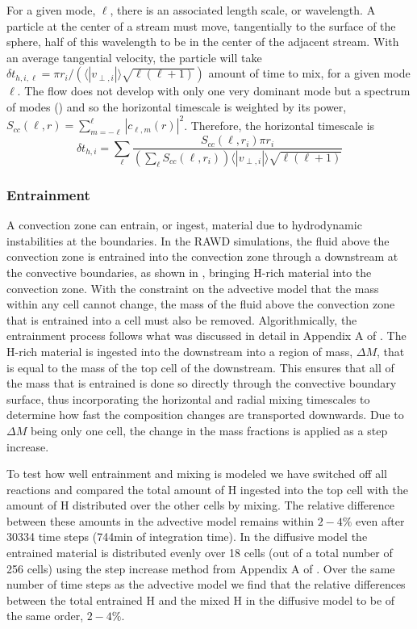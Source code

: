 \documentclass[fleqn,usenatbib]{mnras}
\newcommand{\cldfluid}{fluid above the convection zone}
\begin{document}
For a given mode, $\ell$, there is an associated length scale, or wavelength. A
particle at the center of a stream must move, tangentially to the surface of the
sphere, half of this wavelength to be in the center of the adjacent stream. With
an average tangential velocity, the particle will take $\delta t_{h,i,\ell} =
\pi r_{i} / \left( \langle|v_{\perp,i}|\rangle\sqrt{\ell(\ell+1)} \right)$
amount of time to mix, for a given mode $\ell$. The flow does not develop with
only one very dominant mode but a spectrum of modes () and
so the horizontal timescale is weighted by its power, $S_{cc}(\ell,r) =
\sum_{m=-\ell}^{\ell}|c_{\ell,m}(r)|^{2}$. Therefore, the horizontal timescale
is
%
\begin{equation}
  \label{eq:horizontalT}
  \delta t_{h,i} = \sum_{\ell} \frac{S_{cc}(\ell,r_{i}) \pi r_{i}}{\left( \sum\limits_{\ell} S_{cc}(\ell,r_{i}) \right) \langle |v_{\perp,i}| \rangle\sqrt{\ell(\ell+1)}}
\end{equation}

\subsubsection{Entrainment}
\label{sec:entrain}

A convection zone can entrain, or ingest, material due to hydrodynamic
instabilities at the boundaries. In the RAWD simulations, the \cldfluid{} 
is entrained into the convection zone through a downstream at the convective
boundaries, as shown in , bringing H-rich material into the
convection zone. With the constraint on the advective model that the mass within
any cell cannot change, the mass of the \cldfluid{} that is entrained into
a cell must also be removed. Algorithmically, the entrainment process follows
what was discussed in detail in Appendix A of \citet{Denissenkov:19}. The H-rich
material is ingested into the downstream into a region of mass, $\Delta M$, that
is equal to the mass of the top cell of the downstream. This ensures that all of
the mass that is entrained is done so directly through the convective boundary
surface, thus incorporating the horizontal and radial mixing timescales to
determine how fast the composition changes are transported downwards. Due to
$\Delta M$ being only one cell, the change in the mass fractions is applied as a
step increase.

To test how well entrainment and mixing is modeled we have switched off
all reactions and compared the total amount of H ingested into the top cell with
the amount of H distributed over the other cells by mixing. The relative
difference between these amounts in the advective model remains within $2-4\%$
even after 30334 time steps (\unit{744}{min} of integration time). In the
diffusive model the entrained material is distributed evenly over 18 cells (out
of a total number of 256 cells) using the step increase method from Appendix A
of \citet{Denissenkov:19}. Over the same number of time steps as the advective
model we find that the relative differences between the total entrained H and
the mixed H in the diffusive model to be of the same order, $2-4\%$.
\end{document}
